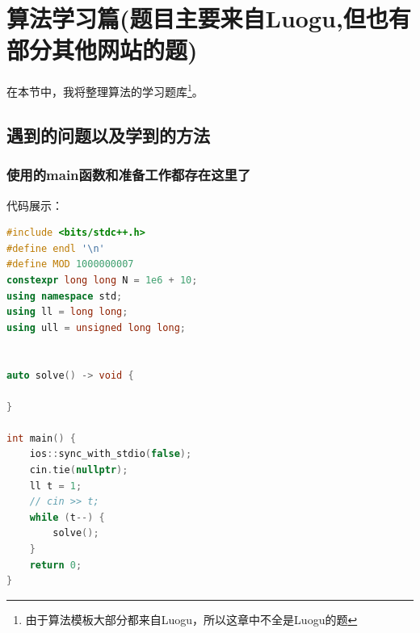 \section{算法学习篇(题目主要来自Luogu,但也有部分其他网站的题)}
在本节中，我将整理算法的学习题库\footnote{由于算法模板大部分都来自Luogu，所以这章中不全是Luogu的题}。

\subsection{遇到的问题以及学到的方法}
\subsubsection{使用的main函数和准备工作都存在这里了}
代码展示：\\
\begin{lstlisting}[language=C++]
#include <bits/stdc++.h>
#define endl '\n'
#define MOD 1000000007
constexpr long long N = 1e6 + 10;
using namespace std;
using ll = long long;
using ull = unsigned long long;


auto solve() -> void {
	
}

int main() {
	ios::sync_with_stdio(false);
	cin.tie(nullptr);
	ll t = 1;
	// cin >> t;
	while (t--) {
		solve();
	}
	return 0;
}
\end{lstlisting}
